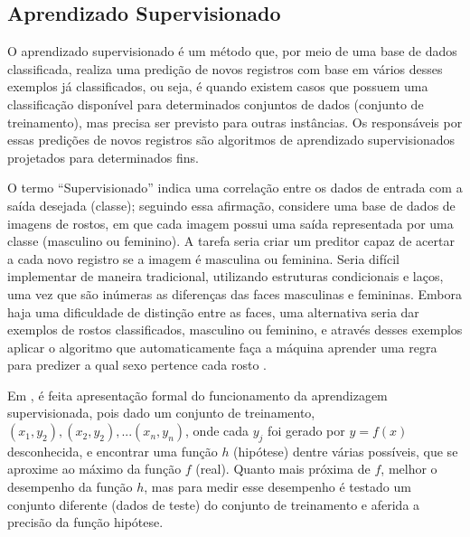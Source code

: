 \subsection{Aprendizado Supervisionado}\label{cap:refTeor:ssec:aprendSup}

O aprendizado supervisionado é um método que, por meio de uma base de dados classificada, realiza uma predição de novos registros com base em vários desses exemplos já classificados, ou seja, é quando existem casos que possuem uma classificação disponível para determinados conjuntos de dados (conjunto de treinamento), mas precisa ser previsto para outras instâncias. Os responsáveis por essas predições de novos registros são algoritmos de aprendizado supervisionados projetados para determinados fins. 

O termo “Supervisionado” indica uma correlação entre os dados de entrada com a saída desejada (classe); seguindo essa afirmação, considere uma base de dados de imagens de rostos, em que cada imagem possui uma saída representada por uma classe (masculino ou feminino). A tarefa seria criar um preditor capaz de acertar a cada novo registro se a imagem é masculina ou feminina. Seria difícil implementar de maneira tradicional, utilizando estruturas condicionais e laços, uma vez que são inúmeras as diferenças das faces masculinas e femininas. Embora haja uma dificuldade de distinção entre as faces, uma alternativa seria dar exemplos de rostos classificados, masculino ou feminino, e através desses exemplos aplicar o algoritmo que automaticamente faça a máquina aprender uma regra para predizer a qual sexo pertence cada rosto \cite{Barber2011}.

Em \cite{RusselStuart.Norvig2013}, é feita apresentação formal do funcionamento da aprendizagem supervisionada, pois dado um conjunto de treinamento, 
${(x_{1},y_{2}),(x_{2},y_{2}),...(x_{n},y_{n})}$, onde cada ${y_{j}} $ foi gerado por ${y=f(x)}$  desconhecida, e encontrar uma função ${h}$ (hipótese) dentre várias possíveis, que se aproxime ao máximo da função ${f}$ (real). Quanto mais próxima de ${f}$,  melhor o desempenho da função ${h}$, mas para medir esse desempenho é testado um conjunto diferente (dados de teste) do conjunto de treinamento e aferida a precisão da função hipótese. 

